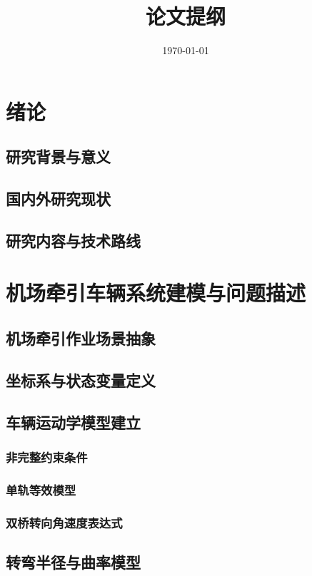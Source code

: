 \documentclass{article}
\title{论文提纲}
\author{}
\date{\today}
\begin{document}
\maketitle

\tableofcontents

\section{绪论}
\subsection{研究背景与意义}
\subsection{国内外研究现状}
\subsection{研究内容与技术路线}

\section{机场牵引车辆系统建模与问题描述}
\subsection{机场牵引作业场景抽象}
\subsection{坐标系与状态变量定义}
\subsection{车辆运动学模型建立}
\subsubsection{非完整约束条件}
\subsubsection{单轨等效模型}
\subsubsection{双桥转向角速度表达式}
\subsection{转弯半径与曲率模型}
\end{document}
